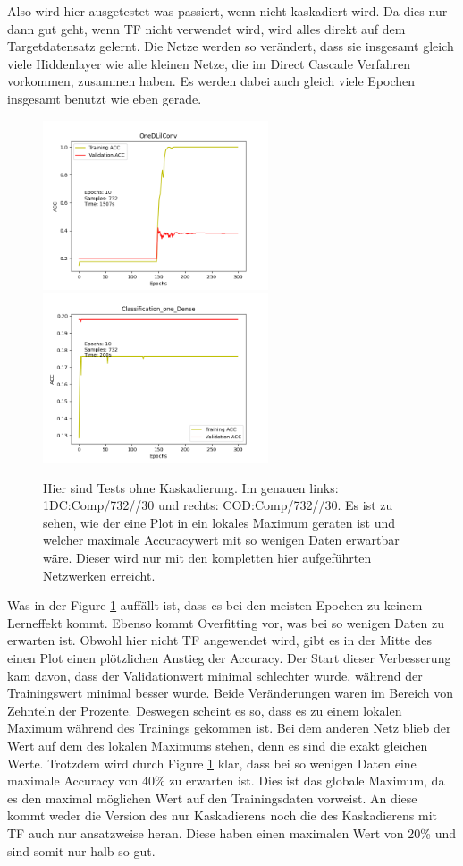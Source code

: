 Also wird hier ausgetestet was passiert, wenn nicht kaskadiert wird. Da dies nur dann gut geht, wenn TF nicht verwendet wird, wird alles direkt 
auf dem Targetdatensatz gelernt. Die Netze werden so verändert, dass sie insgesamt gleich viele Hiddenlayer wie alle kleinen Netze, die im 
Direct Cascade Verfahren vorkommen, zusammen haben. Es werden dabei auch gleich viele Epochen insgesamt benutzt wie eben gerade. 

\begin{figure}[htpb]
    \includegraphics[height=5cm]{../../Plots/ba_plots/classnocascade/1dc.png}
    \includegraphics[height=5cm]{../../Plots/ba_plots/classnocascade/cod.png}
    \caption{\label{fig:nocascade} 
    \small{Hier sind Tests ohne Kaskadierung. Im genauen links: 1DC:Comp/732//30 und rechts: COD:Comp/732//30. Es ist zu sehen, wie der eine Plot 
    in ein lokales Maximum geraten ist und welcher maximale Accuracywert mit so wenigen Daten erwartbar wäre. Dieser wird nur mit den kompletten 
    hier aufgeführten Netzwerken erreicht.}}
\end{figure}

Was in der Figure \ref{fig:nocascade} auffällt ist, dass es bei den meisten Epochen zu keinem Lerneffekt kommt. Ebenso kommt Overfitting vor, was bei so wenigen 
Daten zu erwarten ist. Obwohl hier nicht TF angewendet wird, gibt es in der Mitte des einen Plot einen plötzlichen Anstieg der Accuracy. 
Der Start dieser Verbesserung kam davon, dass der Validationwert minimal schlechter wurde, während der Trainingswert minimal besser wurde. 
Beide Veränderungen waren im Bereich von Zehnteln der Prozente. 
Deswegen scheint es so, dass es zu einem lokalen Maximum während des Trainings gekommen ist. Bei dem anderen Netz blieb der Wert auf dem des 
lokalen Maximums stehen, denn es sind die exakt gleichen Werte. Trotzdem wird durch Figure \ref{fig:nocascade} klar, dass bei so wenigen Daten eine maximale 
Accuracy von 40\% zu erwarten ist. Dies ist das globale Maximum, da es den maximal möglichen Wert auf den Trainingsdaten vorweist. 
An diese kommt weder die Version des nur Kaskadierens noch die des Kaskadierens mit TF auch nur 
ansatzweise heran. Diese haben einen maximalen Wert von 20\% und sind somit nur halb so gut. 

